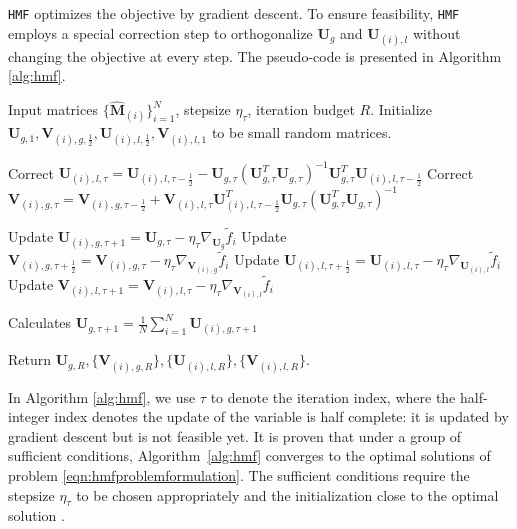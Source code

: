 \documentclass[twoside,11pt]{article}
\def\inneralg{\texttt{JIMF}\xspace}
\def\hmf{\texttt{HMF}\xspace}
\newcommand{\matU}{\mathbf{U}}
\newcommand{\matV}{\mathbf{V}}
\newcommand{\hmatM}{\hat{\mathbf{M}}}
\newcommand{\tf}{\tilde{f}}
\newcommand{\fracud}{\frac{1}{2}}
\begin{document}
\hmf optimizes the objective by gradient descent. To ensure feasibility, \hmf employs a special correction step to orthogonalize $\matU_g$ and $\matU_{(i),l}$ without changing the objective at every step. The pseudo-code is presented in Algorithm \ref{alg:hmf}.


\begin{algorithm}
\caption{\inneralg by heterogeneous matrix factorization}
\label{alg:hmf}
\begin{algorithmic}[1]
\STATE Input matrices $\{\hmatM_{(i)}\}_{i=1}^N$, stepsize $\eta_\tau$, iteration budget $R$.
\STATE Initialize $\matU_{g,1}, \matV_{(i),g,\fracud},\matU_{(i),l,\fracud},\matV_{(i),l,1}$ to be small random matrices.

\STATE Correct $\matU_{(i),l,\tau}=\matU_{(i),l,\tau-\frac{1}{2}}-\matU_{g,\tau}\left(\matU_{g,\tau}^T\matU_{g,\tau}\right)^{-1}\matU_{g,\tau}^T\matU_{(i),l,\tau-\frac{1}{2}}$
\STATE Correct $\matV_{(i),g,\tau}=\matV_{(i),g,\tau-\fracud}+\matV_{(i),l,\tau}\matU_{(i),l,\tau-\fracud}^T\matU_{g,\tau}\left(\matU_{g,\tau}^T\matU_{g,\tau}\right)^{-1}$



\STATE Update $ \matU_{(i),g,\tau+1}=\matU_{g,\tau}-\eta_{\tau}\nabla_{\matU_g}\tf_i$
\STATE Update $ \matV_{(i),g,\tau+\fracud}=\matV_{(i),g,\tau}-\eta_{\tau}\nabla_{\matV_{(i),g}}\tf_i$
\STATE Update $ \matU_{(i),l,\tau+\fracud}=\matU_{(i),l,\tau}-\eta_{\tau}\nabla_{\matU_{(i),l}}\tf_i$
\STATE Update $ \matV_{(i),l,\tau+1}=\matV_{(i),l,\tau}-\eta_{\tau}\nabla_{\matV_{(i),l}}\tf_i$

\ENDFOR
\STATE Calculates $\matU_{g,\tau+1}=\frac{1}{N}\sum_{i=1}^N\matU_{(i),g,\tau+1}$

\ENDFOR
\STATE Return $ \matU_{g,R}, \{\matV_{(i),g,R}\},\{\matU_{(i),l,R}\},\{\matV_{(i),l,R}\}$.
\end{algorithmic}
\end{algorithm}

In Algorithm \ref{alg:hmf}, we use $\tau$ to denote the iteration index, where the half-integer index denotes the update of the variable is half complete: it is updated by gradient descent but is not feasible yet. It is proven that under a group of sufficient conditions, Algorithm~\ref{alg:hmf} converges to the optimal solutions of problem \eqref{eqn:hmfproblemformulation}. The sufficient conditions require the stepsize $\eta_{\tau}$ to be chosen appropriately and the initialization close to the optimal solution \citep{hmf}. 
\end{document}
